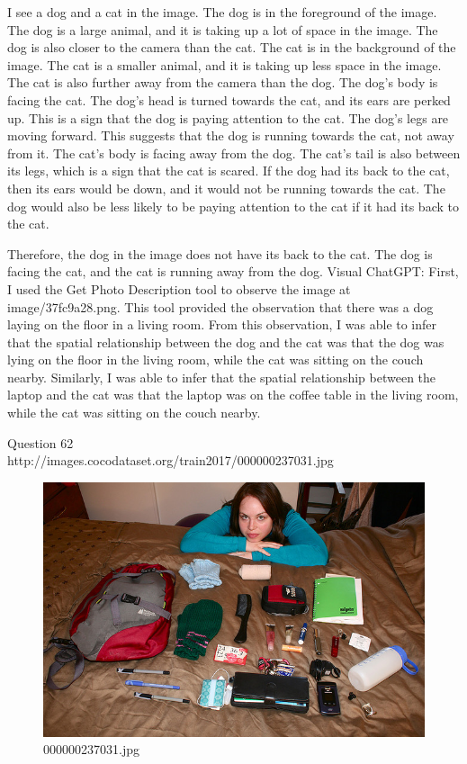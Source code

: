 \begin{enumerate}
    I see a dog and a cat in the image.
    The dog is in the foreground of the image. The dog is a large animal, and it is taking up a lot of space in the image. The dog is also closer to the camera than the cat.
    The cat is in the background of the image. The cat is a smaller animal, and it is taking up less space in the image. The cat is also further away from the camera than the dog.
    The dog's body is facing the cat. The dog's head is turned towards the cat, and its ears are perked up. This is a sign that the dog is paying attention to the cat.
    The dog's legs are moving forward. This suggests that the dog is running towards the cat, not away from it.
    The cat's body is facing away from the dog. The cat's tail is also between its legs, which is a sign that the cat is scared.
    If the dog had its back to the cat, then its ears would be down, and it would not be running towards the cat. The dog would also be less likely to be paying attention to the cat if it had its back to the cat.
    
    Therefore, the dog in the image does not have its back to the cat.
    The dog is facing the cat, and the cat is running away from the dog.
    \subitem Visual ChatGPT: First, I used the Get Photo Description tool to observe the image at image/37fc9a28.png. This tool provided the observation that there was a dog laying on the floor in a living room. From this observation, I was able to infer that the spatial relationship between the dog and the cat was that the dog was lying on the floor in the living room, while the cat was sitting on the couch nearby. Similarly, I was able to infer that the spatial relationship between the laptop and the cat was that the laptop was on the coffee table in the living room, while the cat was sitting on the couch nearby.
\end{enumerate}
Question 62\\
http://images.cocodataset.org/train2017/000000237031.jpg
\begin{figure}[h]
    \centering
    \includegraphics[width=0.8\linewidth]{../image set/hard/000000237031.jpg}
    \caption{000000237031.jpg}
\end{figure}
